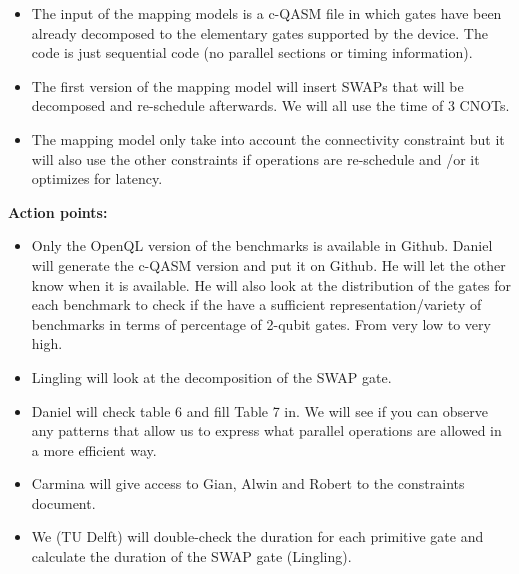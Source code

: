 \documentclass[11pt]{article}
\begin{document}
\begin{itemize}
    \item The input of the mapping models is a c-QASM file in which gates have been already decomposed to the elementary gates supported by the device. The code is just sequential code (no parallel sections or timing information).
    
    \item The first version of the mapping model will insert SWAPs that will be decomposed and re-schedule afterwards. We will all use the time of 3 CNOTs.
    
    \item The mapping model only take into account the connectivity constraint but it will also use the other constraints if operations are re-schedule and /or it optimizes for latency. 
    
    \end{itemize}



\textbf{Action points:}

\begin{itemize}

    \item Only the OpenQL version of the benchmarks is available in Github. Daniel will generate the c-QASM version and put it on Github. He will let the other know when it is available. He will also look at the distribution of the gates for each benchmark to check if the have a sufficient representation/variety of benchmarks in terms of percentage of 2-qubit gates. From very low to very high.
    
    \item Lingling will look at the decomposition of the SWAP gate.
    
    \item Daniel will check table 6 and fill Table 7 in. We will see if you can observe any patterns that allow us to express what parallel operations are allowed in a more efficient way.
    
    \item Carmina will give access to Gian, Alwin and Robert to the constraints document.
    
    \item We (TU Delft) will double-check the duration for each primitive gate and calculate the duration of the SWAP gate (Lingling). 
    
    \end{itemize}
    
    
    
\end{document}
